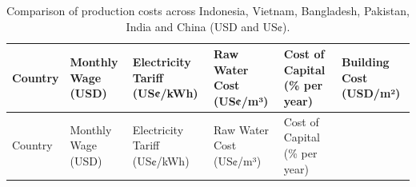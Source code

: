 \documentclass[
  manuscript=article,
  layout=publish,
  year=2026,
  volume=1,
]{den}
\begin{document}
\begin{longtable}[]{@{}
  >{\raggedright\arraybackslash}p{}
  >{\raggedleft\arraybackslash}p{}
  >{\raggedleft\arraybackslash}p{}
  >{\raggedleft\arraybackslash}p{}
  >{\raggedleft\arraybackslash}p{}
  >{\raggedleft\arraybackslash}p{}@{}}
\caption{Comparison of production costs across Indonesia, Vietnam,
Bangladesh, Pakistan, India and China (USD and
US¢).}\label{tbl-costs}\tabularnewline
\toprule\noalign{}
\begin{minipage}[b]{\linewidth}\raggedright
Country
\end{minipage} & \begin{minipage}[b]{\linewidth}\raggedleft
Monthly Wage (USD)
\end{minipage} & \begin{minipage}[b]{\linewidth}\raggedleft
Electricity Tariff (US¢/kWh)
\end{minipage} & \begin{minipage}[b]{\linewidth}\raggedleft
Raw Water Cost (US¢/m³)
\end{minipage} & \begin{minipage}[b]{\linewidth}\raggedleft
Cost of Capital (\% per year)
\end{minipage} & \begin{minipage}[b]{\linewidth}\raggedleft
Building Cost (USD/m²)
\end{minipage} \\
\midrule\noalign{}
\endfirsthead
\toprule\noalign{}
\begin{minipage}[b]{\linewidth}\raggedright
Country
\end{minipage} & \begin{minipage}[b]{\linewidth}\raggedleft
Monthly Wage (USD)
\end{minipage} & \begin{minipage}[b]{\linewidth}\raggedleft
Electricity Tariff (US¢/kWh)
\end{minipage} & \begin{minipage}[b]{\linewidth}\raggedleft
Raw Water Cost (US¢/m³)
\end{minipage} & \begin{minipage}[b]{\linewidth}\raggedleft
Cost of Capital (\% per year)
\end{minipage} & \begin{minipage}[b]{\linewidth}\raggedleft

\end{minipage}
\end{longtable}
\end{document}
